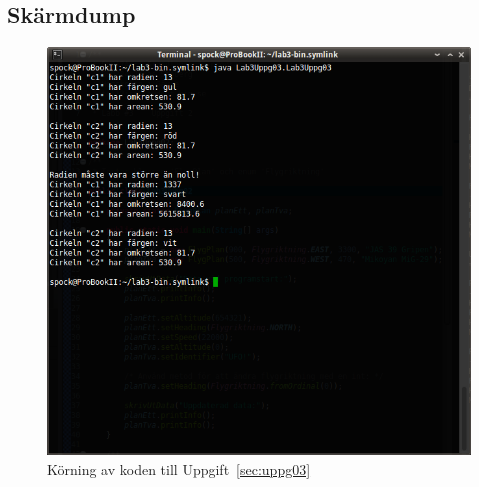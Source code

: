 \subsection{Skärmdump}
\begin{figure}[htbp]
    \centering
        \includegraphics[width=\linewidth]{img/03.png}
    \caption{Körning av koden till Uppgift~\ref{sec:uppg03}}
    \label{fig:uppg03-screenshot}
\end{figure}

